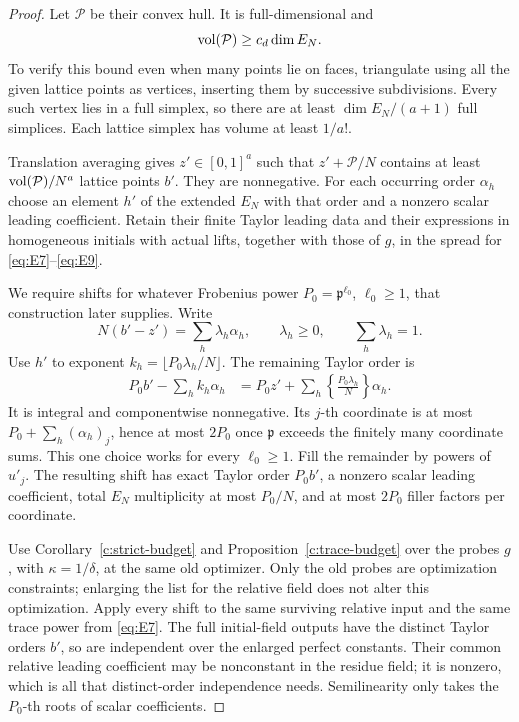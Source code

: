 \begin{proof}
Let \(\mathcal P\) be their convex hull.  It is full-dimensional
and
\[
                         \operatorname{vol}(\mathcal P)\ge c_d\dim E_N.
\]
To verify this bound even when many points lie on faces,
triangulate using all the given lattice points as vertices,
inserting them by successive subdivisions.  Every such
vertex lies in a full simplex, so there are at least
\(\dim E_N/(a+1)\) full simplices.  Each lattice simplex
has volume at least \(1/a!\).

Translation averaging gives \(z'\in[0,1]^a\) such that
\(z'+\mathcal P/N\) contains at least
\(\operatorname{vol}(\mathcal P)/N^a\) lattice points \(b'\).
They are nonnegative.  For each occurring order \(\alpha_h\)
choose an element \(h'\) of the extended \(E_N\) with that
order and a nonzero scalar leading coefficient.
Retain their finite Taylor leading data and their expressions
in homogeneous initials with actual lifts, together with
those of \(g\), in the spread for
\eqref{eq:E7}--\eqref{eq:E9}.

We require shifts for whatever Frobenius power
\(P_0=\mathfrak p^{\ell_0}\), \(\ell_0\ge1\), that construction later supplies.
Write
\[
        N(b'-z')=\sum_h\lambda_h\alpha_h,\qquad
        \lambda_h\ge0,\qquad\sum_h\lambda_h=1.
\]
Use \(h'\) to exponent \(k_h=\lfloor P_0\lambda_h/N\rfloor\).
The remaining Taylor order is
\[
 \begin{split}
  P_0b'-\sum_h k_h\alpha_h
      &=P_0z'+\sum_h
          \left\{\frac{P_0\lambda_h}{N}\right\}\alpha_h.
 \end{split}
\]
It is integral and componentwise nonnegative.
Its \(j\)-th coordinate is at most
\(P_0+\sum_h(\alpha_h)_j\), hence at most \(2P_0\)
once \(\mathfrak p\) exceeds the finitely many coordinate sums.
This one choice works for every \(\ell_0\ge1\).
Fill the remainder by powers of \(u'_j\).
The resulting shift has exact Taylor order \(P_0b'\),
a nonzero scalar leading coefficient, total \(E_N\)
multiplicity at most \(P_0/N\), and at most \(2P_0\)
filler factors per coordinate.

Use Corollary~\ref{c:strict-budget} and
Proposition~\ref{c:trace-budget}
over the probes \(g\), with \(\kappa=1/\delta\), at the
same old optimizer.  Only the old probes are optimization
constraints; enlarging the list for the relative field
does not alter this optimization.
Apply every shift to the same surviving relative input
and the same trace power from \eqref{eq:E7}.
The full initial-field outputs have the distinct Taylor
orders \(b'\), so are independent over the enlarged
perfect constants.  Their common relative leading
coefficient may be nonconstant in the residue field;
it is nonzero, which is all that distinct-order
independence needs.  Semilinearity only takes the
\(P_0\)-th roots of scalar coefficients.


\end{proof}
